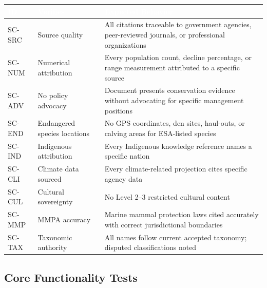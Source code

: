 \documentclass[11pt,letterpaper]{article}
\newcommand{\tableheader}[1]{\textbf{\sffamily\textcolor{white}{#1}}}
\begin{document}
\begin{center}
\begin{tabularx}{\textwidth}{C{1.2cm}L{3cm}X}
\toprule
{}
\tableheader{ID} & \tableheader{Verifies} & \tableheader{Expected Behavior} \\
\midrule
SC-SRC & Source quality & All citations traceable to government agencies, peer-reviewed journals, or professional organizations \\
SC-NUM & Numerical attribution & Every population count, decline percentage, or range measurement attributed to a specific source \\
SC-ADV & No policy advocacy & Document presents conservation evidence without advocating for specific management positions \\
SC-END & Endangered species locations & No GPS coordinates, den sites, haul-outs, or calving areas for ESA-listed species \\
SC-IND & Indigenous attribution & Every Indigenous knowledge reference names a specific nation \\
SC-CLI & Climate data sourced & Every climate-related projection cites specific agency data \\
SC-CUL & Cultural sovereignty & No Level 2--3 restricted cultural content \\
SC-MMP & MMPA accuracy & Marine mammal protection laws cited accurately with correct jurisdictional boundaries \\
SC-TAX & Taxonomic authority & All names follow current accepted taxonomy; disputed classifications noted \\
\bottomrule
\end{tabularx}
\end{center}

\subsection{Core Functionality Tests}
\end{document}
